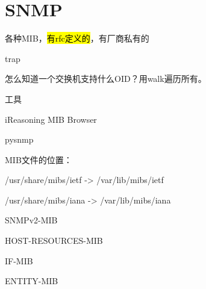 \chapter{SNMP}

各种MIB，\hl{有rfc定义的}，有厂商私有的

trap

怎么知道一个交换机支持什么OID？用walk遍历所有。

工具
\begin{enumbox}
\item iReasoning MIB Browser
\item pysnmp
\end{enumbox}

MIB文件的位置：
\begin{enumbox}
\item /usr/share/mibs/ietf -> /var/lib/mibs/ietf
\item /usr/share/mibs/iana -> /var/lib/mibs/iana
\item SNMPv2-MIB
\item HOST-RESOURCES-MIB
\item IF-MIB
\item ENTITY-MIB
\end{enumbox}
